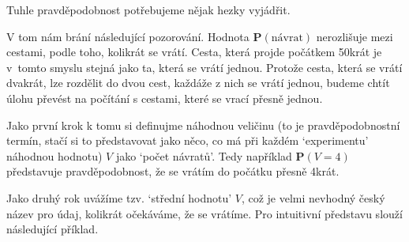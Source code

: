 \documentclass[a4paper,11pt]{article}
\theoremstyle{remark}
\renewcommand{\P}{\mathbf{P}}
\begin{document}
Tuhle pravděpodobnost potřebujeme nějak hezky vyjádřit.

V tom nám brání následující pozorování. Hodnota $\P(\text{návrat})$ nerozlišuje
mezi cestami, podle toho, kolikrát se vrátí. Cesta, která projde počátkem 50krát
je v~tomto smyslu stejná jako ta, která se vrátí jednou. Protože cesta, která se
vrátí dvakrát, lze rozdělit do dvou cest, každáže z nich se vrátí jednou, budeme
chtít úlohu převést na počítání s cestami, které se vrací přesně jednou.

Jako první krok k tomu si definujme náhodnou veličinu (to je pravděpodobnostní
termín, stačí si to představovat jako něco, co má při každém `experimentu'
náhodnou hodnotu) $V$ jako `počet návratů'. Tedy například $\P(V=4)$ představuje
pravděpodobnost, že se vrátím do počátku přesně 4krát.

Jako druhý rok uvážíme tzv. `střední hodnotu' $V$, což je velmi nevhodný český
název pro údaj, kolikrát očekáváme, že se vrátíme. Pro intuitivní představu
slouží následující příklad.
\end{document}
